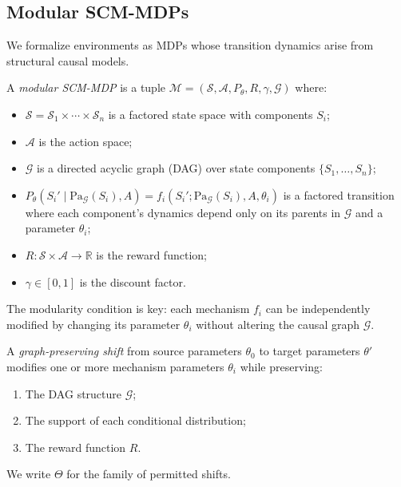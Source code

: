 \documentclass[runningheads]{llncs}
\newcommand{\R}{\mathbb{R}}
\newcommand{\Scal}{\mathcal{S}}
\newcommand{\Acal}{\mathcal{A}}
\newcommand{\Mcal}{\mathcal{M}}
\begin{document}
\subsection{Modular SCM-MDPs}

We formalize environments as MDPs whose transition dynamics arise from structural causal models.

\begin{definition}
\label{def:scm-mdp}
A \emph{modular SCM-MDP} is a tuple $\Mcal = (\Scal, \Acal, P_\theta, R, \gamma, \mathcal{G})$ where:
\begin{itemize}
    \item $\Scal = \Scal_1 \times \cdots \times \Scal_n$ is a factored state space with components $S_i$;
    \item $\Acal$ is the action space;
    \item $\mathcal{G}$ is a directed acyclic graph (DAG) over state components $\{S_1, \ldots, S_n\}$;
    \item $P_\theta(S_i' \mid \mathrm{Pa}_\mathcal{G}(S_i), A) = f_i(S_i' ; \mathrm{Pa}_\mathcal{G}(S_i), A, \theta_i)$ is a factored transition where each component's dynamics depend only on its parents in $\mathcal{G}$ and a parameter $\theta_i$;
    \item $R: \Scal \times \Acal \to \R$ is the reward function;
    \item $\gamma \in [0, 1]$ is the discount factor.
\end{itemize}
\end{definition}

The modularity condition is key: each mechanism $f_i$ can be independently modified by changing its parameter $\theta_i$ without altering the causal graph $\mathcal{G}$.

\begin{definition}
\label{def:shift}
A \emph{graph-preserving shift} from source parameters $\theta_0$ to target parameters $\theta'$ modifies one or more mechanism parameters $\theta_i$ while preserving:
\begin{enumerate}
    \item The DAG structure $\mathcal{G}$;
    \item The support of each conditional distribution;
    \item The reward function $R$.
\end{enumerate}
We write $\Theta$ for the family of permitted shifts.
\end{definition}
\end{document}
